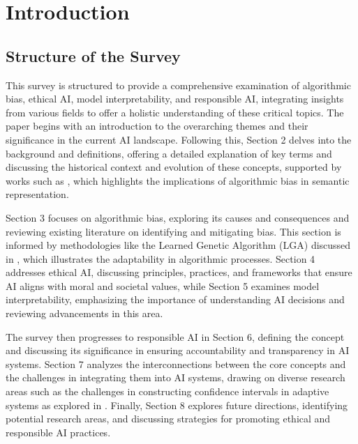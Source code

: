 \section{Introduction} \label{sec:Introduction}


\subsection{Structure of the Survey} \label{subsec:Structure of the Survey}

This survey is structured to provide a comprehensive examination of algorithmic bias, ethical AI, model interpretability, and responsible AI, integrating insights from various fields to offer a holistic understanding of these critical topics. The paper begins with an introduction to the overarching themes and their significance in the current AI landscape. Following this, Section 2 delves into the background and definitions, offering a detailed explanation of key terms and discussing the historical context and evolution of these concepts, supported by works such as \cite{raposo2019lowdimensionalembodiedsemanticsmusic}, which highlights the implications of algorithmic bias in semantic representation.



Section 3 focuses on algorithmic bias, exploring its causes and consequences and reviewing existing literature on identifying and mitigating bias. This section is informed by methodologies like the Learned Genetic Algorithm (LGA) discussed in \cite{lange2023discoveringattentionbasedgeneticalgorithms}, which illustrates the adaptability in algorithmic processes. Section 4 addresses ethical AI, discussing principles, practices, and frameworks that ensure AI aligns with moral and societal values, while Section 5 examines model interpretability, emphasizing the importance of understanding AI decisions and reviewing advancements in this area.



The survey then progresses to responsible AI in Section 6, defining the concept and discussing its significance in ensuring accountability and transparency in AI systems. Section 7 analyzes the interconnections between the core concepts and the challenges in integrating them into AI systems, drawing on diverse research areas such as the challenges in constructing confidence intervals in adaptive systems as explored in \cite{robertson2024confidenceintervalsadaptivetrial}. Finally, Section 8 explores future directions, identifying potential research areas, and discussing strategies for promoting ethical and responsible AI practices.



